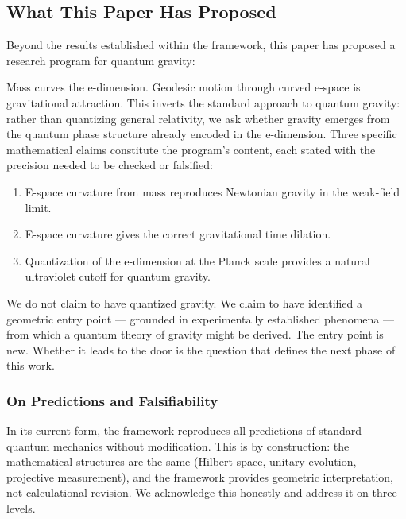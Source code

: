 \documentclass[aps,prd,preprint,superscriptaddress,longbibliography,floatfix]{revtex4-2}
\theoremstyle{remark}
\begin{document}
\subsection{What This Paper Has Proposed}

Beyond the results established within the framework, this paper has proposed a research program for quantum gravity:

Mass curves the e-dimension. Geodesic motion through curved e-space is gravitational attraction. This inverts the standard approach to quantum gravity: rather than quantizing general relativity, we ask whether gravity emerges from the quantum phase structure already encoded in the e-dimension. Three specific mathematical claims constitute the program's content, each stated with the precision needed to be checked or falsified:


\begin{enumerate}
  \item E-space curvature from mass reproduces Newtonian gravity in the weak-field limit.
  \item E-space curvature gives the correct gravitational time dilation.
  \item Quantization of the e-dimension at the Planck scale provides a natural ultraviolet cutoff for quantum gravity.
\end{enumerate}

We do not claim to have quantized gravity. We claim to have identified a geometric entry point --- grounded in experimentally established phenomena --- from which a quantum theory of gravity might be derived. The entry point is new. Whether it leads to the door is the question that defines the next phase of this work.


\subsubsection{On Predictions and Falsifiability}

In its current form, the framework reproduces all predictions of standard quantum mechanics without modification. This is by construction: the mathematical structures are the same (Hilbert space, unitary evolution, projective measurement), and the framework provides geometric interpretation, not calculational revision. We acknowledge this honestly and address it on three levels.
\end{document}
